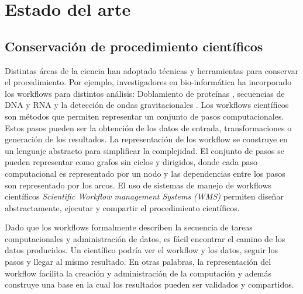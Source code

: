\chapter{Estado del arte}\label{Chapter2} 
\section{Conservación de procedimiento científicos}

Distintas áreas de la ciencia han adoptado técnicas y herramientas para conservar el procedimiento. Por ejemplo, investigadores en bio-informática ha incorporado los workflows para distintos análisis:  Doblamiento de proteínas \cite{craddock2006science}, secuencias de DNA y RNA \cite{blankenberg2010galaxy,giardine2005galaxy} y la detección de ondas gravitacionales \cite{deelman2004pegasus}.
Los workflows científicos son métodos que permiten representar un conjunto de pasos computacionales. Estos pasos pueden ser la obtención de los datos de entrada, transformaciones o generación de los resultados.
La representación de los workflow se construye en un lenguaje abstracto para simplificar la complejidad. El conjunto de pasos se pueden representar como grafos sin ciclos y dirigidos, donde cada paso computacional es representado por un nodo y las dependencias entre los pasos son representado por los arcos.
El uso de sistemas de manejo de workflows científicos \textit{Scientific Workflow management Systems (WMS)} permiten diseñar abstractamente, ejecutar y compartir el procedimiento científicos. 

Dado que los workflows formalmente describen la secuencia de tareas computacionales y administración de datos, es fácil encontrar el camino de los datos producidos.
Un científico podría ver el workflow y los datos, seguir los pasos y llegar al mismo resultado. En otras palabras, la representación del workflow facilita la creación y administración de la computación y además construye una base en la cual los resultados pueden ser validados y compartidos.





